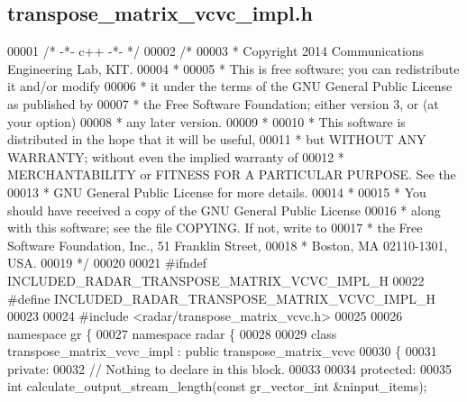 \subsection{transpose\+\_\+matrix\+\_\+vcvc\+\_\+impl.\+h}
\label{transpose__matrix__vcvc__impl_8h_source}

\begin{DoxyCode}
00001 \textcolor{comment}{/* -*- c++ -*- */}
00002 \textcolor{comment}{/* }
00003 \textcolor{comment}{ * Copyright 2014 Communications Engineering Lab, KIT.}
00004 \textcolor{comment}{ * }
00005 \textcolor{comment}{ * This is free software; you can redistribute it and/or modify}
00006 \textcolor{comment}{ * it under the terms of the GNU General Public License as published by}
00007 \textcolor{comment}{ * the Free Software Foundation; either version 3, or (at your option)}
00008 \textcolor{comment}{ * any later version.}
00009 \textcolor{comment}{ * }
00010 \textcolor{comment}{ * This software is distributed in the hope that it will be useful,}
00011 \textcolor{comment}{ * but WITHOUT ANY WARRANTY; without even the implied warranty of}
00012 \textcolor{comment}{ * MERCHANTABILITY or FITNESS FOR A PARTICULAR PURPOSE.  See the}
00013 \textcolor{comment}{ * GNU General Public License for more details.}
00014 \textcolor{comment}{ * }
00015 \textcolor{comment}{ * You should have received a copy of the GNU General Public License}
00016 \textcolor{comment}{ * along with this software; see the file COPYING.  If not, write to}
00017 \textcolor{comment}{ * the Free Software Foundation, Inc., 51 Franklin Street,}
00018 \textcolor{comment}{ * Boston, MA 02110-1301, USA.}
00019 \textcolor{comment}{ */}
00020 
00021 \textcolor{preprocessor}{#ifndef INCLUDED\_RADAR\_TRANSPOSE\_MATRIX\_VCVC\_IMPL\_H}
00022 \textcolor{preprocessor}{#define INCLUDED\_RADAR\_TRANSPOSE\_MATRIX\_VCVC\_IMPL\_H}
00023 
00024 \textcolor{preprocessor}{#include <radar/transpose_matrix_vcvc.h>}
00025 
00026 \textcolor{keyword}{namespace }gr \{
00027   \textcolor{keyword}{namespace }radar \{
00028 
00029     \textcolor{keyword}{class }transpose_matrix_vcvc_impl : \textcolor{keyword}{public} transpose_matrix_vcvc
00030     \{
00031      \textcolor{keyword}{private}:
00032       \textcolor{comment}{// Nothing to declare in this block.}
00033 
00034      \textcolor{keyword}{protected}:
00035       \textcolor{keywordtype}{int} calculate_output_stream_length(\textcolor{keyword}{const} gr\_vector\_int &ninput\_items);

\end{DoxyCode}
